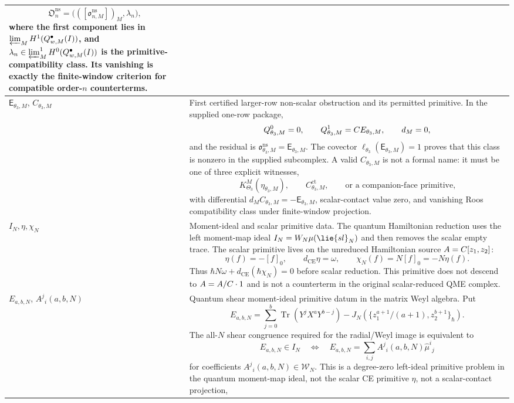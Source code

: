 \begin{longtable}{@{}>{\raggedright\arraybackslash}p{}
  >{\raggedright\arraybackslash}p{}@{}}
\[
  \mathfrak O^{\mathrm{ns}}_n
  =
  \bigl(([\mathfrak o^{\mathrm{ns}}_{n,M}])_M,\lambda_n\bigr),
\]
where the first component lies in
\(\varprojlim_MH^1(\mathcal Q^\bullet_{w,M}(I))\), and
\(\lambda_n\in\varprojlim\nolimits^1_M
H^0(\mathcal Q^\bullet_{w,M}(I))\) is the primitive-compatibility class.
Its vanishing is exactly the finite-window criterion for compatible
order-\(n\) counterterms.\\
\hline
\(\mathsf E_{\theta_3,M}\), \(C_{\theta_3,M}\) &
First certified larger-row non-scalar obstruction and its permitted
primitive.  In the supplied one-row package,
\[
  \mathcal Q^0_{\theta_3,M}=0,\qquad
  \mathcal Q^1_{\theta_3,M}=\C\mathsf E_{\theta_3,M},\qquad
  d_M=0,
\]
and the residual is \(\mathfrak o^{\mathrm{ns}}_{\theta_3,M}
=\mathsf E_{\theta_3,M}\).  The covector
\(\ell_{\theta_3}(\mathsf E_{\theta_3,M})=1\) proves that this class is
nonzero in the supplied subcomplex.  A valid \(C_{\theta_3,M}\) is not a
formal name: it must be one of three explicit witnesses,
\[
  K^M_{\Theta_3}(\eta_{\theta_3,M}),\qquad
  C^{\mathrm{ct}}_{\theta_3,M},\qquad
  \text{or a companion-face primitive,}
\]
with differential \(d_MC_{\theta_3,M}=-\mathsf E_{\theta_3,M}\),
scalar-contact value zero, and vanishing Roos compatibility class under
finite-window projection.\\
\hline
\(I_N,\eta,\chi_N\) &
Moment-ideal and scalar primitive data.  The quantum Hamiltonian
reduction uses the left moment-map ideal
\(I_N=\mathcal W_N\widehat\mu(\lie{sl}_N)\) and then removes the scalar
empty trace.  The scalar primitive lives on the unreduced Hamiltonian
source \(A=\C[z_1,z_2]\):
\[
  \eta(f)=-[f]_0,\qquad d_{\mathrm{CE}}\eta=\omega,\qquad
  \chi_N(f)=N[f]_0=-N\eta(f).
\]
Thus
\(\hbar N\omega+d_{\mathrm{CE}}(\hbar\chi_N)=0\) before scalar
reduction.  This primitive does not descend to
\(\bar A=A/\C\cdot1\) and is not a counterterm in the original
scalar-reduced QME complex.\\
\hline
\(E_{a,b,N}\), \(A^j{}_i(a,b,N)\) &
Quantum shear moment-ideal primitive datum in the matrix Weyl algebra.
Put
\[
  E_{a,b,N}
  =
  \sum_{j=0}^b\operatorname{Tr}(Y^jX^aY^{b-j})
  -
  J_N\!\left(
    \{z_1^{a+1}/(a+1),z_2^{b+1}\}_\hbar
  \right).
\]
The all-\(N\) shear congruence required for the radial/Weyl image is
equivalent to
\[
  E_{a,b,N}\in I_N
  \quad\Longleftrightarrow\quad
  E_{a,b,N}
    =
  \sum_{i,j}A^j{}_i(a,b,N)\widehat\mu^i{}_j
\]
for coefficients \(A^j{}_i(a,b,N)\in\mathcal W_N\).  This is a
degree-zero left-ideal primitive problem in the quantum moment-map ideal,
not the scalar CE primitive \(\eta\), not a scalar-contact projection,

\end{longtable}

